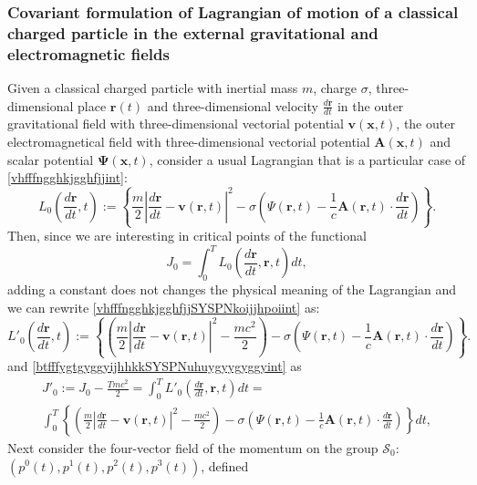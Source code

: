 \documentclass{article}
\theoremstyle{definition}
\theoremstyle{remark}
\renewcommand{\vec}[1]{\mathbf{#1}}
\newcommand{\er}{\eqref}
\newcommand{\er}{\eqref}
\begin{document}
\subsubsection{Covariant formulation of Lagrangian of motion of a
classical charged particle in the external gravitational and
electromagnetic fields} Given a classical charged particle with
inertial mass $m$, charge $\sigma$, three-dimensional place $\vec
r(t)$ and three-dimensional velocity $\frac{d\vec r}{dt}$ in the
outer gravitational field with three-dimensional vectorial potential
$\vec v(\vec x,t)$, the outer electromagnetical field with
three-dimensional vectorial potential $\vec A(\vec x,t)$ and scalar
potential $\vec \Psi(\vec x,t)$, consider a usual Lagrangian that is
a particular case of \er{vhfffngghkjgghfjjint}:
\begin{equation}\label{vhfffngghkjgghfjjSYSPNkoijjhpoiint}
L_0\left(\frac{d\vec r}{dt},t\right):=
\left\{\frac{m}{2}\left|\frac{d\vec r}{dt}-\vec v(\vec
r,t)\right|^2-\sigma\left(\Psi(\vec r,t)-\frac{1}{c}\vec A(\vec
r,t)\cdot\frac{d\vec r}{dt}\right)\right\}.
\end{equation}
Then, since we are interesting in critical points of the functional
\begin{equation}\label{btfffygtgyggyijhhkkSYSPNuhuygyygyggyint}
J_0=\int_0^T L_0\left(\frac{d\vec r}{dt},\vec r,t\right)dt,
\end{equation}
adding a constant does not changes the physical meaning of the
Lagrangian and we can rewrite
\er{vhfffngghkjgghfjjSYSPNkoijjhpoiint} as:
\begin{equation}\label{vhfffngghkjgghfjjSYSPNkoijjhpoiuuiint}
L'_0\left(\frac{d\vec r}{dt},t\right):=
\left\{\left(\frac{m}{2}\left|\frac{d\vec r}{dt}-\vec v(\vec
r,t)\right|^2-\frac{mc^2}{2}\right)-\sigma\left(\Psi(\vec
r,t)-\frac{1}{c}\vec A(\vec r,t)\cdot\frac{d\vec
r}{dt}\right)\right\}.
\end{equation}
and \er{btfffygtgyggyijhhkkSYSPNuhuygyygyggyint} as
\begin{multline}\label{btfffygtgyggyijhhkkSYSPNuhuygyygyggyuyyint}
J'_0:=J_0-\frac{Tmc^2}{2}=\int_0^T L'_0\left(\frac{d\vec r}{dt},\vec
r,t\right)dt=\\ \int_0^T\left\{\left(\frac{m}{2}\left|\frac{d\vec
r}{dt}-\vec v(\vec
r,t)\right|^2-\frac{mc^2}{2}\right)-\sigma\left(\Psi(\vec
r,t)-\frac{1}{c}\vec A(\vec r,t)\cdot\frac{d\vec
r}{dt}\right)\right\}dt,
\end{multline}
Next consider the four-vector field of the momentum on the group
$\mathcal{S}_0$: $\left(p^0(t),p^1(t),p^2(t),p^3(t)\right)$, defined
\end{document}
